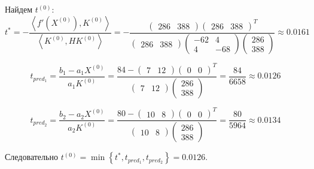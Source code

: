 Найдем $t^{(0)}$:
\begin{equation*}
t^* = - \dfrac{\left\langle f'(X^{(0)}), K^{(0)} \right\rangle}{\left\langle K^{(0)}, HK^{(0)} \right\rangle} = 
- \dfrac{\begin{pmatrix} 286 & 388 \end{pmatrix} \begin{pmatrix} 286 & 388 \end{pmatrix}^T}{\begin{pmatrix} 286 & 388 \end{pmatrix} \begin{pmatrix} -62 & 4 \\ 4 & -68 \end{pmatrix} \begin{pmatrix} 286 \\ 388 \end{pmatrix}} \approx 0.0161
\end{equation*}

\begin{equation*}
t_{pred_1} = \dfrac{b_1 - a_1 X^{(0)}}{a_1 K^{(0)}} = \dfrac{84 - \begin{pmatrix} 7 & 12 \end{pmatrix} \begin{pmatrix} 0 & 0 \end{pmatrix}^T}{\begin{pmatrix} 7 & 12 \end{pmatrix} \begin{pmatrix} 286 \\ 388 \end{pmatrix}} = \dfrac{84}{6658} \approx 0.0126
\end{equation*}

\begin{equation*}
t_{pred_2} = \dfrac{b_2 - a_2 X^{(0)}}{a_2 K^{(0)}} = \dfrac{80 - \begin{pmatrix} 10 & 8 \end{pmatrix} \begin{pmatrix} 0 & 0 \end{pmatrix}^T}{\begin{pmatrix} 10 & 8 \end{pmatrix} \begin{pmatrix} 286 \\ 388 \end{pmatrix}} = \dfrac{80}{5964} \approx 0.0134
\end{equation*}

Следовательно $t^{(0)} = \min \left\{ t^*, t_{pred_1}, t_{pred_2} \right\} = 0.0126$.
 

